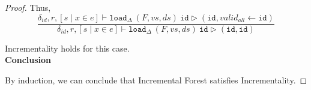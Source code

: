 \documentclass[10pt,twoside,a4paper]{article}
\theoremstyle{theorem}
\theoremstyle{lemma}
\theoremstyle{property}
\theoremstyle{definition}
\theoremstyle{assumption}
\def\id{\mathtt{id}}
\begin{document}
\begin{proof}
	Thus,
	\begin{displaymath}
	\frac
	{\delta_{id}, r, [ s \mid x \in e] \vdash \mathtt{load}_\Delta~ (F,vs,ds)~ \id \rhd (\id, valid_{all} \leftarrow \id)}
	{\delta_{id}, r, [ s \mid x \in e] \vdash \mathtt{load}_\Delta~ (F,vs,ds)~ \id \rhd (\id, \id)}
	\end{displaymath}

	Incrementality holds for this case.\\

	\textbf{Conclusion}

	By induction, we can conclude that Incremental Forest satisfies Incrementality.
\end{proof}
\end{document}
